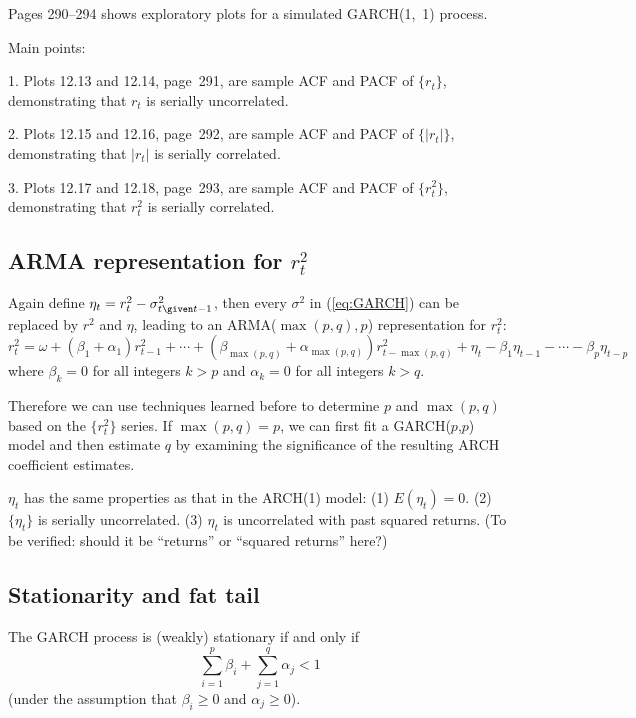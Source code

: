 \documentclass[12pt]{article}
\begin{document}
Pages 290--294 shows exploratory plots for a simulated GARCH(1,~1)
process.

Main points:

1. Plots 12.13 and 12.14, page~291, are sample ACF and PACF
of $\{r_t\}$, demonstrating
that $r_t$ is serially uncorrelated.

2. Plots 12.15 and 12.16, page~292, are sample ACF and PACF
of $\{|r_t|\}$, demonstrating
that $|r_t|$ is serially correlated.

3. Plots 12.17 and 12.18, page~293, are sample ACF and PACF
of $\{r_t^2\}$, demonstrating
that $r_t^2$ is serially correlated.

\subsection{ARMA representation for $r_t^2$}

Again define
$\eta_t = r_t^2 - \sigma_{t\given t-1}^2$,
then every $\sigma^2$ in (\ref{eq:GARCH}) can be
replaced by $r^2$ and $\eta$,
leading to an
ARMA($\max(p,q), p$) representation for $r^2_t$:
\begin{equation}\label{eq:GARCH-ARMA-square}
r_t^2
= \omega
    + (\beta_1 + \alpha_1) r^2_{t-1}
    + \dotsb
    + (\beta_{\max(p,q)} + \alpha_{\max(p,q)}) r^2_{t - \max(p,q)}
    + \eta_t
    - \beta_1 \eta_{t-1}
    - \dotsb
    - \beta_p \eta_{t-p}
\end{equation}
where
$\beta_k = 0$ for all integers
$k > p$
and $\alpha_k = 0$ for all integers
$k > q$.

Therefore we can use techniques learned before
to determine $p$ and $\max(p,q)$ based on the
$\{r_t^2\}$ series.
If $\max(p,q) = p$, we can first fit a GARCH($p$,$p$) model and then
estimate $q$ by examining the significance of the resulting
ARCH coefficient estimates.


$\eta_t$ has the same properties as that in the ARCH(1) model:
(1) $E(\eta_t) = 0$.
(2) $\{\eta_t\}$ is serially uncorrelated.
(3) $\eta_t$ is uncorrelated with past squared returns.
(To be verified: should it be ``returns'' or ``squared returns'' here?)

\subsection{Stationarity and fat tail}

The GARCH process is (weakly) stationary if and only if
\[
\sum_{i=1}^p \beta_i + \sum_{j=1}^q \alpha_j < 1
\]
(under the assumption that
$\beta_i \ge 0$ and $\alpha_j \ge 0$).
\end{document}
